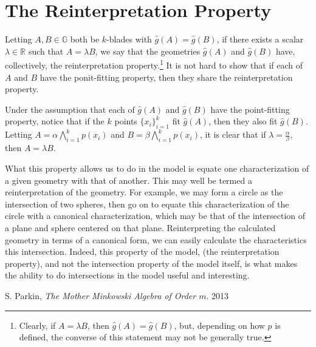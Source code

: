 \documentclass{birkjour}
\theoremstyle{definition}
\theoremstyle{remark}
\numberwithin{equation}{section}
\newcommand{\R}{\mathbb{R}}
\newcommand{\G}{\mathbb{G}}
\newcommand{\gh}{\hat{g}}
\begin{document}

\section{The Reinterpretation Property}

Letting $A,B\in\G$ both be $k$-blades with $\gh(A)=\gh(B)$, if there
exists a scalar $\lambda\in\R$ such that $A=\lambda B$, we say that
the geometries $\gh(A)$ and $\gh(B)$ have, collectively, the reinterpretation property.\footnote{Clearly,
if $A=\lambda B$, then $\gh(A)=\gh(B)$, but, depending on how $p$ is defined, the
converse of this statement may not be generally true.}
It is not hard to show that if each of $A$ and $B$ have the ponit-fitting property,
then they share the reinterpretation property.

Under the assumption that each of $\gh(A)$ and $\gh(B)$ have the point-fitting property,
notice that if the $k$ points $\{x_i\}_{i=1}^k$ fit $\gh(A)$,
then they also fit $\gh(B)$.  Letting $A=\alpha\bigwedge_{i=1}^k p(x_i)$ and
$B=\beta\bigwedge_{i=1}^k p(x_i)$, it is clear that if $\lambda =\frac{\alpha}{\beta}$,
then $A=\lambda B$.

What this property allows us to do in the model is equate one characterization of a given
geometry with that of another.  This may well be termed a reinterpretation of the geometry.
For example, we may form a circle as the intersection of two spheres, then go on
to equate this characterization of the circle with a canonical characterization, which may
be that of the intersection of a plane and sphere centered on that plane.  Reinterpreting
the calculated geometry in terms of a canonical form, we can easily
calculate the characteristics this intersection.  Indeed, this property of the model, (the reinterpretation property),
and not the intersection property of the model itself, is what makes the ability to do intersections
in the model useful and interesting.

\begin{thebibliography}{9}

S. Parkin, {\it The Mother Minkowski Algebra of Order $m$}.
2013
\end{thebibliography}
\end{document}
